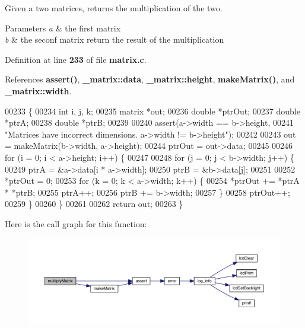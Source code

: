Given a two matrices, returns the multiplication of the two. 


\begin{DoxyParams}{Parameters}
{\em a} & the first matrix \\
\hline
{\em b} & the seconf matrix return the result of the multiplication \\
\hline
\end{DoxyParams}


Definition at line \textbf{ 233} of file \textbf{ matrix.\+c}.



References \textbf{ assert()}, \textbf{ \+\_\+matrix\+::data}, \textbf{ \+\_\+matrix\+::height}, \textbf{ make\+Matrix()}, and \textbf{ \+\_\+matrix\+::width}.


\begin{DoxyCode}
00233                                              \{
00234   \textcolor{keywordtype}{int} i, j, k;
00235   matrix *out;
00236   \textcolor{keywordtype}{double} *ptrOut;
00237   \textcolor{keywordtype}{double} *ptrA;
00238   \textcolor{keywordtype}{double} *ptrB;
00239 
00240   assert(a->width == b->height,
00241          \textcolor{stringliteral}{"Matrices have incorrect dimensions. a->width != b->height"});
00242 
00243   out = makeMatrix(b->width, a->height);
00244   ptrOut = out->data;
00245 
00246   \textcolor{keywordflow}{for} (i = 0; i < a->height; i++) \{
00247 
00248     \textcolor{keywordflow}{for} (j = 0; j < b->width; j++) \{
00249       ptrA = &a->data[i * a->width];
00250       ptrB = &b->data[j];
00251 
00252       *ptrOut = 0;
00253       \textcolor{keywordflow}{for} (k = 0; k < a->width; k++) \{
00254         *ptrOut += *ptrA * *ptrB;
00255         ptrA++;
00256         ptrB += b->width;
00257       \}
00258       ptrOut++;
00259     \}
00260   \}
00261 
00262   \textcolor{keywordflow}{return} out;
00263 \}
\end{DoxyCode}
Here is the call graph for this function\+:
\nopagebreak
\begin{figure}[H]
\begin{center}
\leavevmode
\includegraphics[width=350pt]{matrix_8c_a63ed5c518b34768e9ef8e9d5f7d0b534_cgraph}
\end{center}
\end{figure}
\mbox{\label{matrix_8c_a50ab2b1ac33d6993d93522fc4f30a051}} 
